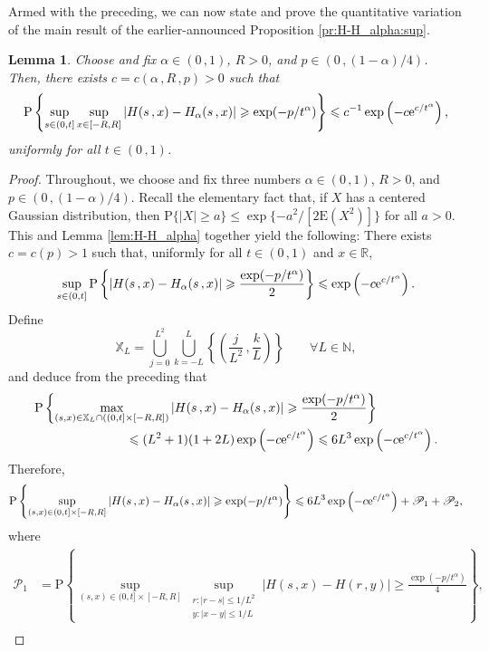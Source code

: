 \documentclass[reqno]{amsart}
\newcommand{\<}{\langle}
\renewcommand{\>}{\rangle}
\newcommand{\N}{\mathbb{N}}
\newcommand{\R}{\mathbb{R}}
\renewcommand{\P}{\mathrm{P}}
\newcommand{\E}{\mathrm{E}}
\newcommand{\1}{\mathbb{1}}
\newcommand{\e}{{\rm e}}
\renewcommand{\ge}{\geqslant}
\renewcommand{\le}{\leqslant}
\newtheorem{lemma}[stat]{Lemma}
\theoremstyle{definition}
\numberwithin{equation}{section}
\begin{document}
Armed with the preceding, we can now state and prove the quantitative variation of
the main result of the earlier-announced Proposition \ref{pr:H-H_alpha:sup}.

\begin{lemma}\label{lem:H-H_alpha:prob}
	Choose and fix $\alpha \in (0\,,1)$, $R>0$, and $p \in (0\,,(1-\alpha)/4)$.
	Then, there exists $c = c(\alpha\,,R\,,p)>0$ such that
	\begin{align*}
		\P\left\{ \sup_{s \in (0,t]} \sup_{x \in [-R,R]}
		|H(s\,,x)-H_\alpha(s\,,x)| \ge \exp(-p/t^\alpha) \right\}
		\le c^{-1} \exp\left( -c\e^{c/t^\alpha}\right),
	\end{align*}
	uniformly for all $t \in (0\,,1)$.
\end{lemma}

\begin{proof}
	Throughout, we choose and fix three numbers $\alpha\in(0\,,1)$, $R>0$, and
	$p \in (0\,,(1-\alpha)/4)$.
	Recall the elementary fact that, if $X$ has a centered Gaussian distribution, then
	$\P\{|X|\ge a\} \le \exp\{- a^2/[2\E(X^2)]\}$ for all $a>0$.
	This and Lemma \ref{lem:H-H_alpha} together yield the following: There exists
	$c=c(p)>1$ such that, uniformly for all 
	$t \in (0\,,1)$ and $x\in\R$,
	\[
		\sup_{s \in (0,t]}
		\P\left\{ |H(s\,,x)-H_\alpha(s\,,x)| \ge \frac{\exp(-p/t^\alpha) }{2}\right\}
		\le \exp\left( - c \e^{c/t^\alpha} \right).
	\]
	Define
	\begin{equation}\label{X_L}
		\mathbb{X}_L = \bigcup_{j=0}^{L^2}\bigcup_{k=-L}^L
		\left\{\left( \frac{j}{L^2}\,,\frac{k}{L}\right)\right\}\qquad\forall L\in\N,
	\end{equation}
	and deduce from the preceding that
	\begin{align*}
		&\P\left\{ \max_{(s,x)\in\mathbb{X}_L\cap((0,t]\times[-R,R])}
			|H(s\,,x)-H_\alpha(s\,,x)| \ge \frac{\exp(-p/t^\alpha) }{2}\right\}\\
		&\hskip1in\le (L^2+1)(1+2L) \exp\left( -c\e^{c/t^\alpha} \right)
			\le 6 L^3\exp\left( -c\e^{c/t^\alpha} \right).
	\end{align*}
	Therefore,
	\[
		\P\left\{ \sup_{(s,x)\in (0,t] \times[-R,R]}
		|H(s\,,x)-H_\alpha(s\,,x)| \ge \exp(-p/t^\alpha)\right\}
		\le 6 L^3\exp\left( -c\e^{c/t^\alpha} \right)
		+ \mathscr{P}_1 + \mathscr{P}_2,
	\]
	where
	\begin{align*}
		\mathscr{P}_1 &= \P\left\{ \sup_{(s,x)\in (0,t] \times[-R,R]}
    			\sup_{\substack{r:|r-s|\le 1/L^2\\
			y:|x-y|\le 1/L}} |H(s\,,x)-H(r\,,y)| \ge \frac{\exp(-p/t^\alpha)}{4}\right\},\\

\end{align*}
\end{proof}
\end{document}
